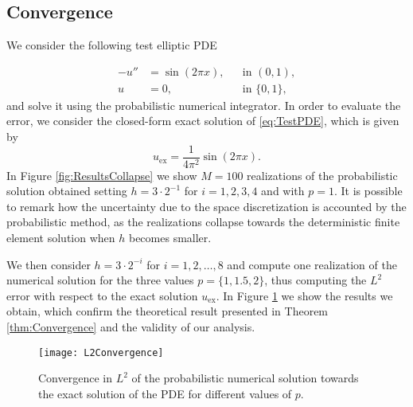 \documentclass[10pt]{article}
\begin{document}
\subsection{Convergence} We consider the following test elliptic PDE

\begin{equation}\label{eq:TestPDE}
\begin{aligned}
	-u'' &= \sin(2\pi x), && \text{in } (0, 1),\\
	u &= 0, && \text{in } \{0, 1\},
\end{aligned}
\end{equation}	
and solve it using the probabilistic numerical integrator. In order to evaluate the error, we consider the closed-form exact solution of \eqref{eq:TestPDE}, which is given by
\begin{equation}
	u_{\mathrm{ex}} = \frac{1}{4\pi^2} \sin(2 \pi x).
\end{equation}
In Figure \ref{fig:ResultsCollapse} we show $M = 100$ realizations of the probabilistic solution obtained setting $h = 3 \cdot 2^{-1}$ for $i = 1, 2, 3, 4$ and with $p = 1$. It is possible to remark how the uncertainty due to the space discretization is accounted by the probabilistic method, as the realizations collapse towards the deterministic finite element solution when $h$ becomes smaller.

We then consider $h = 3 \cdot 2^{-i}$ for $i = 1, 2, \ldots, 8$ and compute one realization of the numerical solution for the three values $p = \{1, 1.5, 2\}$, thus computing the $L^2$ error with respect to the exact solution $u_{\mathrm{ex}}$. In Figure \ref{fig:ResultsConvergence} we show the results we obtain, which confirm the theoretical result presented in Theorem \ref{thm:Convergence} and the validity of our analysis.

\begin{figure}[t]
	\centering
	\texttt{[image: L2Convergence]}
	\caption{Convergence in $L^2$ of the probabilistic numerical solution towards the exact solution of the PDE for different values of $p$.}
	\label{fig:ResultsConvergence}
\end{figure}
\end{document}
